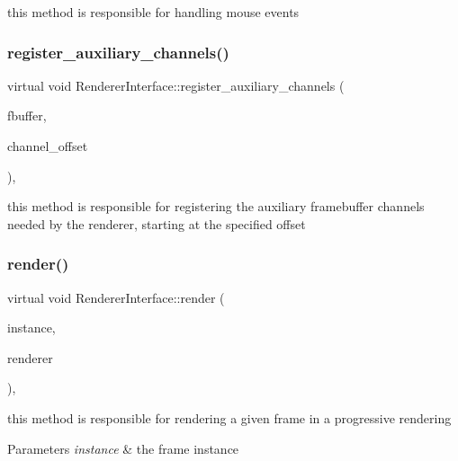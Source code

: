 this method is responsible for handling mouse events \mbox{\label{struct_renderer_interface_aca2dd8b8b27e3e6f7fcf81c0d8d17ce5}} 
\subsubsection{\texorpdfstring{register\+\_\+auxiliary\+\_\+channels()}{register\_auxiliary\_channels()}}
{\footnotesize\ttfamily virtual void Renderer\+Interface\+::register\+\_\+auxiliary\+\_\+channels (\begin{DoxyParamCaption}\item[{\hyperlink{struct_f_buffer_storage}{F\+Buffer\+Storage} \&}]{fbuffer,  }\item[{const uint32}]{channel\+\_\+offset }\end{DoxyParamCaption})\hspace{0.3cm}{\ttfamily [inline]}, {\ttfamily [virtual]}}

this method is responsible for registering the auxiliary framebuffer channels needed by the renderer, starting at the specified offset \mbox{\label{struct_renderer_interface_aa64254dd44c94929b05092dc8d74f29d}} 
\subsubsection{\texorpdfstring{render()}{render()}}
{\footnotesize\ttfamily virtual void Renderer\+Interface\+::render (\begin{DoxyParamCaption}\item[{const uint32}]{instance,  }\item[{\hyperlink{struct_rendering_context}{Rendering\+Context} \&}]{renderer }\end{DoxyParamCaption})\hspace{0.3cm}{\ttfamily [inline]}, {\ttfamily [virtual]}}

this method is responsible for rendering a given frame in a progressive rendering


\begin{DoxyParams}{Parameters}
{\em instance} & the frame instance \\
\hline
\end{DoxyParams}


